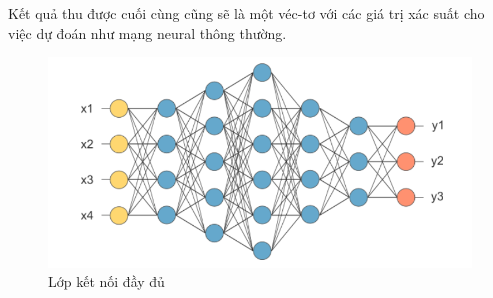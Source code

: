 Kết quả thu được cuối cùng cũng sẽ là một véc-tơ với các giá trị xác suất cho việc dự đoán như mạng neural thông thường.

\begin{figure}[H]
	\centering
	\includegraphics[width=0.8\linewidth]{images/fullyconnected.png}
	\caption{Lớp kết nối đầy đủ}
\end{figure}


